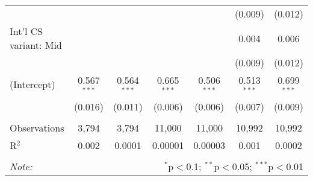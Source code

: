 \begin{tabular}{@{\extracolsep{5pt}}lcccccc}
  &  &  &  &  & (0.009) & (0.012) \\ 
  Int'l CS variant: Mid &  &  &  &  & 0.004 & 0.006 \\ 
  &  &  &  &  & (0.009) & (0.012) \\ 
  (Intercept) & 0.567$^{***}$ & 0.564$^{***}$ & 0.665$^{***}$ & 0.506$^{***}$ & 0.513$^{***}$ & 0.699$^{***}$ \\ 
  & (0.016) & (0.011) & (0.006) & (0.006) & (0.007) & (0.009) \\ 
 \hline \\[-1.8ex] 
Observations & 3,794 & 3,794 & 11,000 & 11,000 & 10,992 & 10,992 \\ 
R$^{2}$ & 0.002 & 0.0001 & 0.00001 & 0.00003 & 0.001 & 0.0002 \\ 
\hline 
\hline \\[-1.8ex] 
\textit{Note:}  & \multicolumn{6}{r}{$^{*}$p$<$0.1; $^{**}$p$<$0.05; $^{***}$p$<$0.01} \\ 
\end{tabular} 
